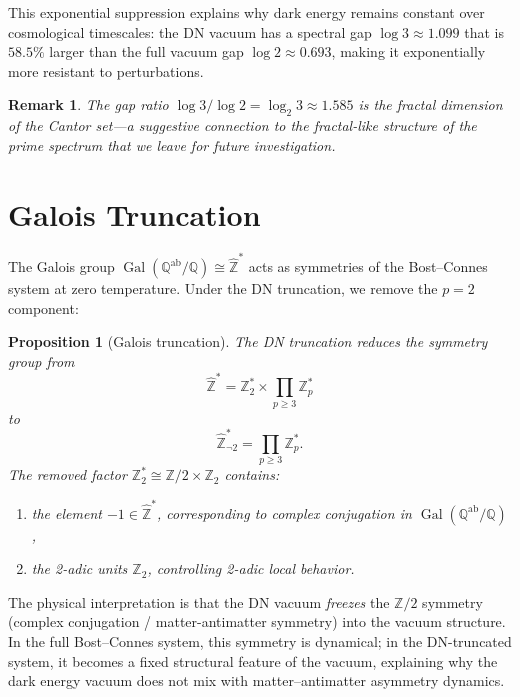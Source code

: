 \documentclass[12pt,a4paper]{article}
\newtheorem{proposition}[theorem]{Proposition}
\newtheorem{remark}[theorem]{Remark}
\newcommand{\Gal}{\operatorname{Gal}}
\newcommand{\Zhat}{\hat{\mathbb{Z}}}
\newcommand{\Qab}{\mathbb{Q}^{\mathrm{ab}}}
\begin{document}
This exponential suppression explains why dark energy remains constant over cosmological timescales: the DN vacuum has a spectral gap $\log 3 \approx 1.099$ that is $58.5\%$ larger than the full vacuum gap $\log 2 \approx 0.693$, making it exponentially more resistant to perturbations.

\begin{remark}
The gap ratio $\log 3/\log 2 = \log_2 3 \approx 1.585$ is the fractal dimension of the Cantor set---a suggestive connection to the fractal-like structure of the prime spectrum that we leave for future investigation.
\end{remark}

\section{Galois Truncation}
\label{sec:galois}

The Galois group $\Gal(\Qab/\mathbb{Q}) \cong \Zhat^*$ acts as symmetries of the Bost--Connes system at zero temperature. Under the DN truncation, we remove the $p=2$ component:

\begin{proposition}[Galois truncation]\label{prop:galois}
The DN truncation reduces the symmetry group from
\begin{equation}
  \Zhat^* = \mathbb{Z}_2^* \times \prod_{p \geq 3}\mathbb{Z}_p^*
\end{equation}
to
\begin{equation}
  \Zhat_{\neg 2}^* = \prod_{p \geq 3}\mathbb{Z}_p^*.
\end{equation}
The removed factor $\mathbb{Z}_2^* \cong \mathbb{Z}/2 \times \mathbb{Z}_2$ contains:
\begin{enumerate}[label=(\alph*)]
\item the element $-1 \in \Zhat^*$, corresponding to complex conjugation in $\Gal(\Qab/\mathbb{Q})$,
\item the 2-adic units $\mathbb{Z}_2$, controlling 2-adic local behavior.
\end{enumerate}
\end{proposition}

The physical interpretation is that the DN vacuum \emph{freezes} the $\mathbb{Z}/2$ symmetry (complex conjugation / matter-antimatter symmetry) into the vacuum structure. In the full Bost--Connes system, this symmetry is dynamical; in the DN-truncated system, it becomes a fixed structural feature of the vacuum, explaining why the dark energy vacuum does not mix with matter--antimatter asymmetry dynamics.
\end{document}
